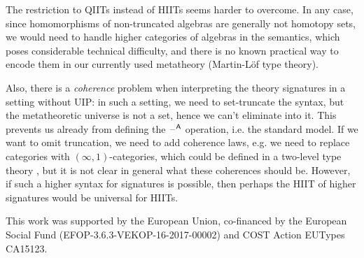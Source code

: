 \documentclass[acmsmall,review]{acmart}\settopmatter{printfolios=true,printccs=false,printacmref=false}
\begin{document}
The restriction to QIITs instead of HIITs seems harder to overcome. In
any case, since homomorphisms of non-truncated algebras are generally
not homotopy sets, we would need to handle higher categories of
algebras in the semantics, which poses considerable technical
difficulty, and there is no known practical way to encode them in our
currently used metatheory (Martin-Löf type theory).

Also, there is a \emph{coherence} problem when interpreting the theory
signatures in a setting without UIP: in such a setting, we need to
set-truncate the syntax, but the metatheoretic universe is not a set,
hence we can't eliminate into it. This prevents us already from
defining the $\mathord{\hspace{1pt}\text{--}\hspace{1pt}}^{\mathsf{A}}$ operation, i.e. the standard model. If we
want to omit truncation, we need to add coherence laws, e.g. we need
to replace categories with $(\infty,1)$-categories, which could be
defined in a two-level type theory \cite{semisegal}, but it is not
clear in general what these coherences should be. However, if such a
higher syntax for signatures is possible, then perhaps the HIIT of
higher signatures would be universal for HIITs.




\begin{acks}                            %
This work was supported by the European Union, co-financed by the
European Social Fund (EFOP-3.6.3-VEKOP-16-2017-00002) and COST Action
EUTypes CA15123.
\end{acks}



\end{document}
